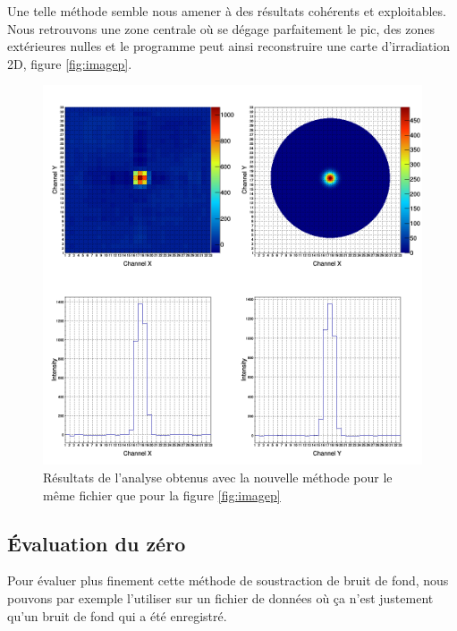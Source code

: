 \documentclass[a4paper,11pt]{article}
\begin{document}
Une telle méthode semble nous amener à des résultats cohérents et exploitables.
Nous retrouvons une zone centrale où se dégage parfaitement le pic, des zones extérieures nulles et le programme peut ainsi reconstruire une carte d’irradiation 2D, figure \ref{fig:imagep}.
\begin{figure}[h]
\begin{center}
\includegraphics[scale=0.4]{Image.png} 
\caption{\label{fig:image}\footnotesize{Résultats de l’analyse obtenus avec la nouvelle méthode pour le même fichier que pour la figure \ref{fig:imagep}}}
\end{center}
\end{figure}

\subsection*{Évaluation du zéro}
Pour évaluer plus finement cette méthode de soustraction de bruit de fond, nous pouvons par exemple l’utiliser sur un fichier de données où ça n’est justement qu’un bruit de fond qui a été enregistré.
\end{document}
